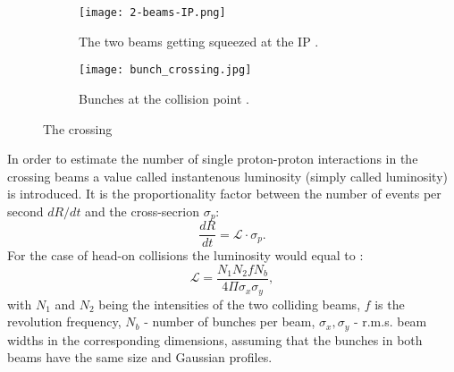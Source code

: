 	\begin{figure}[htbp]
	\begin{subfigure}[t]{0.48\textwidth}
		\texttt{[image: 2-beams-IP.png]}
		\caption[Two beams]{The two beams getting squeezed at the IP \cite{2beams}.}
		\label{fig::2beams}
	\end{subfigure}
	\hfill
	\begin{subfigure}[t]{0.48\textwidth}
		\texttt{[image: bunch\_crossing.jpg]}
		\caption[Bunches colliding]{Bunches at the collision point \cite{collisions}.}
		\label{fig::bunches_collision}
	\end{subfigure}
	\caption{The crossing}
	\label{fig::interaction_point}
	\end{figure}
	In order to estimate the number of single proton-proton interactions in the crossing beams a value called instantenous luminosity (simply called luminosity) is introduced. It is the proportionality factor between the number of events per second $dR/dt$ and the cross-secrion $\sigma_p$:
	 \begin{equation}
	\nonumber
	\frac{dR}{dt} = \mathcal{L} \cdot \sigma_p.
	\end{equation}
	For the case of head-on collisions the luminosity would equal to \cite{Lumi}:
	\begin{equation}
	\mathcal{L} = \frac{N_1N_2fN_b}{4\Pi \sigma_x \sigma_y},
	\end{equation}
	with $N_1$ and $N_2$ being the intensities of the two colliding beams, $f$ is the revolution frequency, $N_b$ - number of bunches per beam, $ \sigma_x,\sigma_y$ - r.m.s. beam widths in the corresponding dimensions, assuming that the bunches in both beams have the same size and Gaussian profiles. \\

